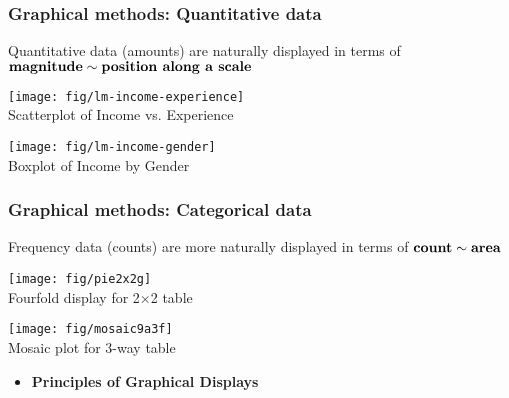 \begin{frame}
\frametitle{Graphical methods: Quantitative data}
Quantitative data (amounts) are  naturally displayed in terms of
	\(
	\mbox{\bf magnitude} \sim \mbox{\bf position along a scale}
	\)

\vspace{1ex}
 \begin{minipage}[t]{.45\textwidth}
  \texttt{[image: fig/lm-income-experience]}
  \\ \centering Scatterplot of Income vs. Experience
 \end{minipage}%
 \hfill
 \begin{minipage}[t]{.45\textwidth}
  \texttt{[image: fig/lm-income-gender]}
  \\ \centering Boxplot of Income by Gender
 \end{minipage}

\end{frame}

\begin{frame}
\frametitle{Graphical methods: Categorical data}
Frequency data (counts) are more naturally displayed in terms of
	\(
	\mbox{\bf count} \sim \mbox{\bf area}
	\)
	\citep{Friendly:95}

 \begin{minipage}[t]{.45\textwidth}
  \texttt{[image: fig/pie2x2g]}
  \\ \centering Fourfold display for 2$\times$2 table
 \end{minipage}%
 \hfill
 \begin{minipage}[t]{.45\textwidth}
  \texttt{[image: fig/mosaic9a3f]}
  \\ \centering Mosaic plot for 3-way table
 \end{minipage}

\end{frame}

\begin{frame}

  \begin{itemize}
	\item{\large\bfseries Principles of Graphical Displays}
  \end{itemize}
\end{frame}

